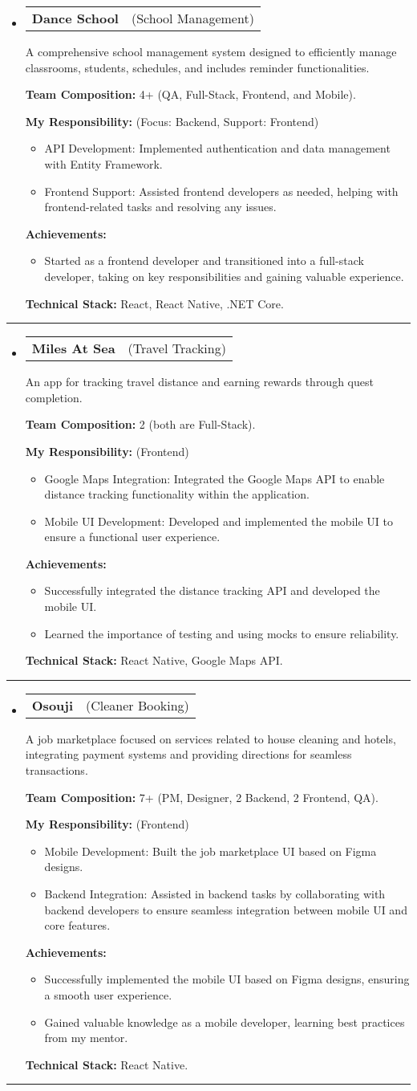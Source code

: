 \documentclass[letterpaper,11pt]{article}
\makeatletter
\newcommand{\resumeProjectTitle}[2]{
  \vspace{-2pt}\item
    \begin{tabular*}{1\textwidth}[t]{l @{\hskip 2pt} r}
      \textbf{#1} & \small #2 \\
    \end{tabular*}\vspace{2pt}
}
\newcommand{\resumeDesc}[1]{
  {#1\\ \vspace{2px}}
}
\newcommand{\resumeItem}[1]{
  \item{#1 \vspace{-2pt}}
}
\newcommand{\resumeItemListTitle}[1]{%
  \vspace{0pt} \textbf{#1} \vspace{-2pt}%
}
\newcommand{\resumeItemListStart}{\vspace{-4pt}\begin{itemize}[leftmargin=12px]}
\newcommand{\resumeItemListEnd}{\end{itemize}\vspace{-5pt}}
\newcommand{\resumeSubHeadingListStart}{\begin{itemize}[leftmargin=0pt, label={}]}
\newcommand{\resumeSubHeadingListEnd}{\end{itemize}\vspace{-8pt}}
\makeatother
\begin{document}
\resumeSubHeadingListStart
\resumeProjectTitle{Dance School}{(School Management)}
\resumeDesc{A comprehensive school management system designed to efficiently manage classrooms, students, schedules, and includes reminder functionalities.}
\resumeItemListTitle{Team Composition:} 4+ (QA, Full-Stack, Frontend, and Mobile).
\par
\resumeItemListTitle{My Responsibility:} (Focus: Backend, Support: Frontend)
\resumeItemListStart
    \resumeItem{API Development: Implemented authentication and data management with Entity Framework.}
    \resumeItem{Frontend Support: Assisted frontend developers as needed, helping with frontend-related tasks and resolving any issues.}
\resumeItemListEnd
\resumeItemListTitle{Achievements:}
\resumeItemListStart
    \resumeItem{Started as a frontend developer and transitioned into a full-stack developer, taking on key responsibilities and gaining valuable experience.}
\resumeItemListEnd
\resumeItemListTitle{Technical Stack:} React, React Native, .NET Core.
\resumeSubHeadingListEnd
\noindent\rule{\textwidth}{0.4pt}

\resumeSubHeadingListStart
\resumeProjectTitle{Miles At Sea}{(Travel Tracking)}
\resumeDesc{An app for tracking travel distance and earning rewards through quest completion.}
\resumeItemListTitle{Team Composition:} 2 (both are Full-Stack).
\par
\resumeItemListTitle{My Responsibility:} (Frontend)
\resumeItemListStart
    \resumeItem{Google Maps Integration: Integrated the Google Maps API to enable distance tracking functionality within the application.}
    \resumeItem{Mobile UI Development: Developed and implemented the mobile UI to ensure a functional user experience.}
\resumeItemListEnd
\resumeItemListTitle{Achievements:}
\resumeItemListStart
    \resumeItem{Successfully integrated the distance tracking API and developed the mobile UI.}
    \resumeItem{Learned the importance of testing and using mocks to ensure reliability.}
\resumeItemListEnd
\resumeItemListTitle{Technical Stack:} React Native, Google Maps API.
\resumeSubHeadingListEnd
\noindent\rule{\textwidth}{0.4pt}

\resumeSubHeadingListStart
\resumeProjectTitle{Osouji}{(Cleaner Booking)}
\resumeDesc{A job marketplace focused on services related to house cleaning and hotels, integrating payment systems and providing directions for seamless transactions.}
\resumeItemListTitle{Team Composition:} 7+ (PM, Designer, 2 Backend, 2 Frontend, QA).
\par
\resumeItemListTitle{My Responsibility:} (Frontend)
\resumeItemListStart
    \resumeItem{Mobile Development: Built the job marketplace UI based on Figma designs.}
    \resumeItem{Backend Integration: Assisted in backend tasks by collaborating with backend developers to ensure seamless integration between mobile UI and core features.}
\resumeItemListEnd
\resumeItemListTitle{Achievements:}
\resumeItemListStart
    \resumeItem{Successfully implemented the mobile UI based on Figma designs, ensuring a smooth user experience.}
    \resumeItem{Gained valuable knowledge as a mobile developer, learning best practices from my mentor.}
\resumeItemListEnd
\resumeItemListTitle{Technical Stack:} React Native.
\resumeSubHeadingListEnd
\noindent\rule{\textwidth}{0.4pt}
\end{document}
